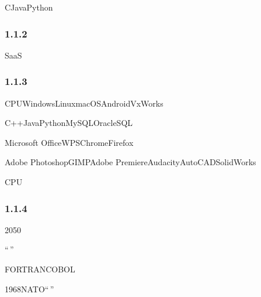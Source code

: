 
CJavaPython



\hypertarget{section-5}{%
\subsubsection{1.1.2}\label{section-5}}




SaaS








\hypertarget{section-6}{%
\subsubsection{1.1.3}\label{section-6}}


CPUWindowsLinuxmacOSAndroidVxWorks

C++JavaPythonMySQLOracleSQL


Microsoft OfficeWPSChromeFirefox

Adobe PhotoshopGIMPAdobe PremiereAudacityAutoCADSolidWorks


CPU

\hypertarget{section-7}{%
\subsubsection{1.1.4}\label{section-7}}


2050

``\,''


FORTRANCOBOL

1968NATO``\,''

